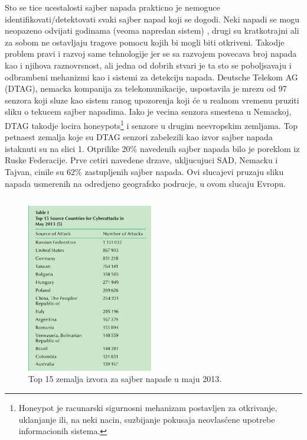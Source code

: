 \documentclass[a4paper]{article}
\begin{document}
{Sto se tice ucestalosti sajber napada prakticno je nemoguce identifikovati/detektovati svaki sajber napad koji se dogodi.
Neki napadi se mogu neopazeno odvijati godinama (veoma napredan sistem) , drugi su kratkotrajni ali za sobom ne ostavljaju tragove pomocu kojih bi mogli biti otkriveni.
Takodje problem pravi i razvoj same tehnologije jer se sa razvojem povecava broj napada kao i njihova raznovrsnost, ali jedna od dobrih stvari je ta sto se poboljsavaju i odbrambeni mehanizmi kao i sistemi za detekciju napada.  
Deutsche Telekom AG (DTAG), nemacka kompanija za telekomunikacije, uspostavila je mrezu od 97 senzora koji
sluze kao sistem ranog upozorenja koji će u realnom vremenu pruziti  sliku o tekucem sajber napadima. 
Iako je vecina senzora smestena u Nemackoj, DTAG takodje locira honeypots\footnote{Honeypot je racunarski sigurnosni mehanizam postavljen za otkrivanje, uklanjanje ili, na neki nacin, suzbijanje pokusaja neovlasćene upotrebe informacionih sistema.
} 
i senzore u drugim neevropskim zemljama.
\newline
Top petnaest zemalja koje su DTAG senzori zabelezili kao izvor sajber napada istaknuti su na slici 1. 
Otprilike 20\% navedenih sajber napada bilo je poreklom iz Ruske Federacije. 
Prve cetiri navedene drzave, ukljucujuci SAD, Nemacku i Tajvan, cinile su 62\% zastupljenih sajber napada.
Ovi slucajevi pruzaju sliku napada usmerenih na odredjeno geografsko podrucje, u ovom slucaju Evropu.
 


\begin{verbatim}
\end{verbatim}

\begin{figure}[h!]
  \centering
  \begin{center}
  \includegraphics[width=55mm]{slika1.jpg}
  \end{center}
  \caption{Top 15 zemalja izvora za sajber napade u maju 2013. \cite{Overview of current cyber attacks}}
  \label{fig:vr1}
\end{figure}

}
\end{document}
